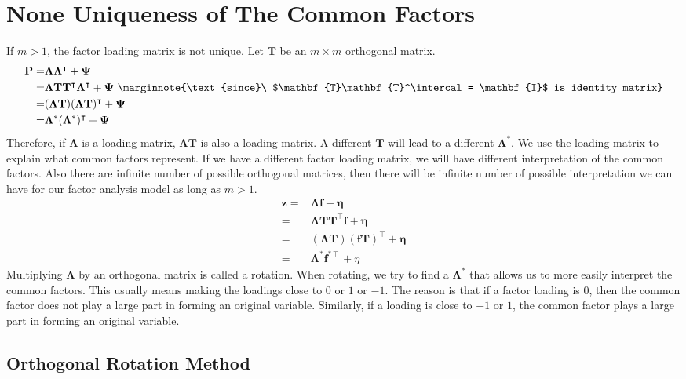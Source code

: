 \documentclass{article}
\begin{document}
\section{None Uniqueness of The Common Factors}

If $m>1$, the factor loading matrix is not unique. Let $\mathbf{T}$ be an $m\times m$ orthogonal matrix.
\begin{align*}
\mathbf{P} =& \mathbf{\Lambda}\mathbf{\Lambda}^\intercal+\mathbf{\Psi}\\
           =& \mathbf{\Lambda}\mathbf{T}\mathbf{T}^\intercal\mathbf{\Lambda}^\intercal+\mathbf{\Psi}\ \marginnote{\text{since}\ $\mathbf{T}\mathbf{T}^\intercal = \mathbf{I}$ is identity matrix}\\
           =& (\mathbf{\Lambda T})(\mathbf{\Lambda T})^\intercal + \mathbf{\Psi}\\
           =& \mathbf{\Lambda}^*(\mathbf{\Lambda}^*)^\intercal+\mathbf{\Psi}
\end{align*}
Therefore, if $\mathbf{\Lambda}$ is a loading matrix, $\mathbf{\Lambda T}$ is also a loading matrix. A different $\mathbf{T}$ will lead to a different $\mathbf{\Lambda}^*$. We use the loading matrix to explain what common factors represent. If we have a different factor loading matrix, we will have different interpretation of the common factors. Also there are infinite number of possible orthogonal matrices, then there will be infinite number of possible interpretation we can have for our factor analysis model as long as $m>1$.
\begin{align*}
\mathbf{z} =& \mathbf{\Lambda f}+\mathbf{\eta}\\
           =& \mathbf{\Lambda T}\mathbf{T}^\intercal\mathbf{f}+\mathbf{\eta}\\
           =& (\mathbf{\Lambda T})(\mathbf{f T})^\intercal+\mathbf{\eta}\\
           =& \mathbf{\Lambda}^*\mathbf{f}^{*\intercal}+\eta
\end{align*}
Multiplying $\mathbf{\Lambda}$ by an orthogonal matrix is called a rotation. When rotating, we try to find a $\mathbf{\Lambda}^*$ that allows us to more easily interpret the common factors. This usually means making the loadings close to $0$ or $1$ or $-1$. The reason is that if a factor loading is $0$, then the common factor does not play a large part in forming an original variable. Similarly, if a loading is close to $-1$ or $1$, the common factor plays a large part in forming an original variable. 

\subsection{Orthogonal Rotation Method}
\end{document}
